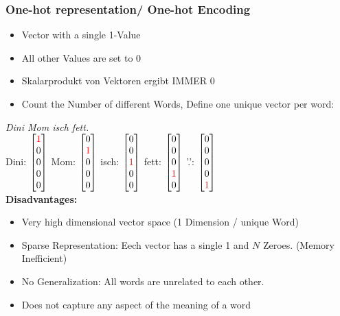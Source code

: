 \subsubsection{One-hot representation/ One-hot Encoding}
\begin{itemize}
    \item Vector with a single 1-Value
    \item All other Values are set to 0
    \item Skalarprodukt von Vektoren ergibt IMMER 0
    \item Count the Number of different Words, Define one unique vector per word:
\end{itemize}
\textit{Dini Mom isch fett.}\\
Dini: $\begin{bmatrix} \textcolor{red}{1}\\ 0\\ 0\\ 0\\ 0\end{bmatrix}$
Mom: $\begin{bmatrix} 0\\ \textcolor{red}{1}\\ 0\\ 0\\ 0\end{bmatrix}$
isch: $\begin{bmatrix} 0\\ 0\\ \textcolor{red}{1}\\ 0\\ 0\end{bmatrix}$
fett: $\begin{bmatrix} 0\\ 0\\ 0\\ \textcolor{red}{1}\\ 0\end{bmatrix}$
'.': $\begin{bmatrix} 0\\ 0\\ 0\\ 0\\ \textcolor{red}{1}\end{bmatrix}$\\ 
\textbf{Disadvantages:}
\begin{itemize}
    \item Very high dimensional vector space (1 Dimension / unique Word)
    \item Sparse Representation: Eech vector has a single 1 and $N$ Zeroes. (Memory Inefficient)
    \item No Generalization: All words are unrelated to each other.
    \item Does not capture any aspect of the meaning of a word
\end{itemize}

